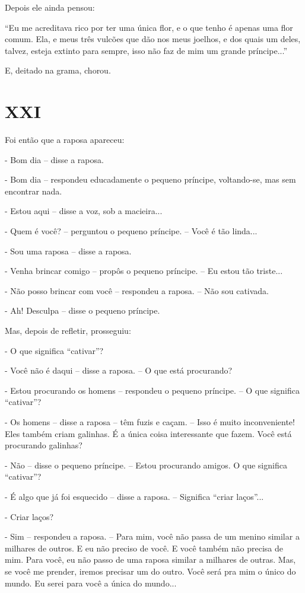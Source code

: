 Depois ele ainda pensou:

``Eu me acreditava rico por ter uma única flor, e o que tenho é apenas
uma flor comum. Ela, e meus três vulcões que dão nos meus joelhos, e dos
quais um deles, talvez, esteja extinto para sempre, isso não faz de mim
um grande príncipe...''

E, deitado na grama, chorou.

\chapter{XXI}

Foi então que a raposa apareceu:

- Bom dia -- disse a raposa.

- Bom dia -- respondeu educadamente o pequeno príncipe, voltando-se, mas
sem encontrar nada.

- Estou aqui -- disse a voz, sob a macieira...

- Quem é você? -- perguntou o pequeno príncipe. -- Você é tão linda...

- Sou uma raposa -- disse a raposa.

- Venha brincar comigo -- propôs o pequeno príncipe. -- Eu estou tão
triste...

- Não posso brincar com você -- respondeu a raposa. -- Não sou cativada.

- Ah! Desculpa -- disse o pequeno príncipe.

Mas, depois de refletir, prosseguiu:

- O que significa ``cativar''?

- Você não é daqui -- disse a raposa. -- O que está procurando?

- Estou procurando os homens -- respondeu o pequeno príncipe. -- O que
significa ``cativar''?

- Os homens -- disse a raposa -- têm fuzis e caçam. -- Isso é muito
inconveniente! Eles também criam galinhas. É a única coisa interessante
que fazem. Você está procurando galinhas?

- Não -- disse o pequeno príncipe. -- Estou procurando amigos. O que
significa ``cativar''?

- É algo que já foi esquecido -- disse a raposa. -- Significa ``criar
laços''...

- Criar laços?

- Sim -- respondeu a raposa. -- Para mim, você não passa de um menino
similar a milhares de outros. E eu não preciso de você. E você também
não precisa de mim. Para você, eu não passo de uma raposa similar a
milhares de outras. Mas, se você me prender, iremos precisar um do
outro. Você será pra mim o único do mundo. Eu serei para você a única do
mundo...

